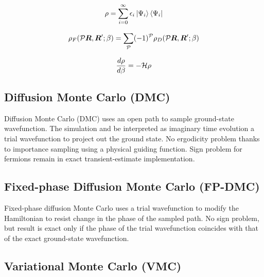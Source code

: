 \begin{equation}
\rho = \sum\limits_{i=0}^\infty \epsilon_i \ket{\Psi_i}\bra{\Psi_i} 
\end{equation}

\begin{equation}
\rho_F(\mathcal{P}\boldsymbol{R}, \boldsymbol{R}'; \beta) = \sum\limits_{\mathcal{P}} (-1)^{\mathcal{P}} \rho_D (\mathcal{P}\boldsymbol{R}, \boldsymbol{R}'; \beta)
\end{equation}

\begin{equation}
\dfrac{d\rho}{d\beta} = -\mathcal{H} \rho
\end{equation}

\subsection{Diffusion Monte Carlo (DMC)}
Diffusion Monte Carlo (DMC) uses an open path to sample ground-state wavefunction. The simulation and be interpreted as imaginary time evolution a trial wavefunction to project out the ground state. No ergodicity problem thanks to importance sampling using a physical guiding function. Sign problem for fermions remain in exact transient-estimate implementation.

\subsection{Fixed-phase Diffusion Monte Carlo (FP-DMC)}
Fixed-phase diffusion Monte Carlo uses a trial wavefunction to modify the Hamiltonian to resist change in the phase of the sampled path. No sign problem, but result is exact only if the phase of the trial wavefunction coincides with that of the exact ground-state wavefunction.

\subsection{Variational Monte Carlo (VMC)}


